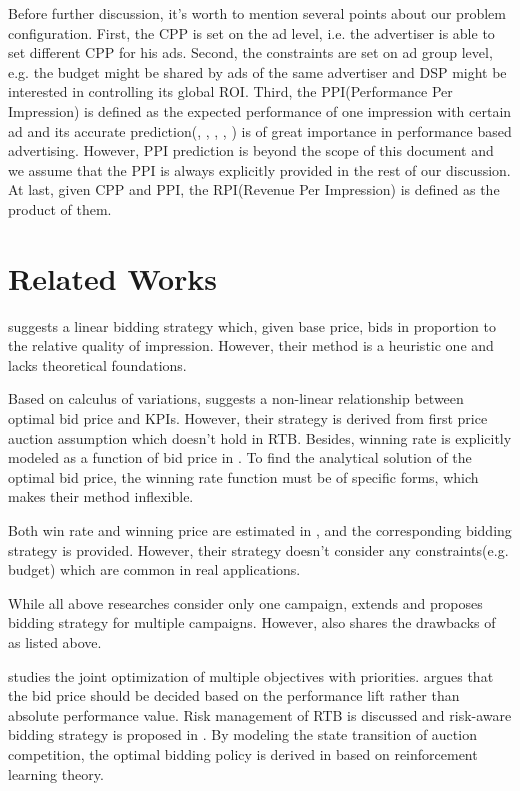 \documentclass{article}
\begin{document}
Before further discussion, it's worth to mention several points about our problem configuration.
First, the CPP is set on the ad level, i.e. the advertiser is able to set different CPP for his ads.
Second, the constraints are set on ad group level,
    e.g. the budget might be shared by ads of the same advertiser
    and DSP might be interested in controlling its global ROI.
Third, the PPI(Performance Per Impression) is defined as the expected performance of one impression with certain ad
    and its accurate prediction(\cite{Google2013}, \cite{Facebook2014}, \cite{FFM2016}, \cite{CVR}, \cite{DelayedFeedback})
    is of great importance in performance based advertising.
However, PPI prediction is beyond the scope of this document
    and we assume that the PPI is always explicitly provided in the rest of our discussion.
At last, given CPP and PPI, the RPI(Revenue Per Impression) is defined as the product of them.

\section{Related Works}

\cite{M6D} suggests a linear bidding strategy which, given base price,
    bids in proportion to the relative quality of impression.
However, their method is a heuristic one and lacks theoretical foundations.

Based on calculus of variations, \cite{WeinanZhang2014} suggests a non-linear relationship between optimal bid price and KPIs.
However, their strategy is derived from first price auction assumption which doesn't hold in RTB.
Besides, winning rate is explicitly modeled as a function of bid price in \cite{WeinanZhang2014}.
To find the analytical solution of the optimal bid price,
    the winning rate function must be of specific forms,
    which makes their method inflexible.

Both win rate and winning price are estimated in \cite{XiangLi2014}, and the corresponding bidding strategy is provided.
However, their strategy doesn't consider any constraints(e.g. budget) which are common in real applications.

While all above researches consider only one campaign,
    \cite{WeinanZhang2015} extends \cite{WeinanZhang2014} and proposes bidding strategy for multiple campaigns.
However, \cite{WeinanZhang2015} also shares the drawbacks of \cite{WeinanZhang2014} as listed above.

\cite{Joint2016} studies the joint optimization of multiple objectives with priorities.
\cite{Lift2016} argues that the bid price should be decided
    based on the performance lift rather than absolute performance value.
Risk management of RTB is discussed and risk-aware bidding strategy is proposed in \cite{Risk2017}.
By modeling the state transition of auction competition,
    the optimal bidding policy is derived in \cite{Reinforce2017} based on reinforcement learning theory.
\end{document}
